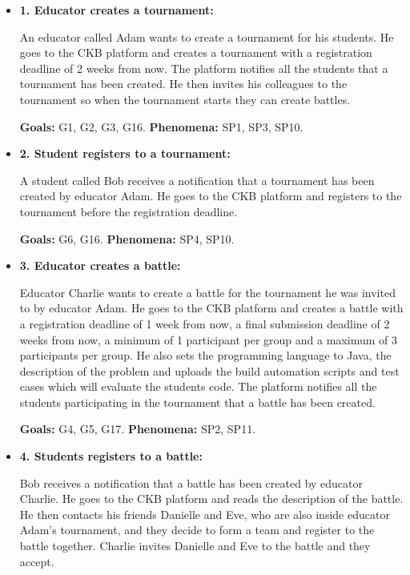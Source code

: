 \documentclass{article}
\begin{document}
\begin{itemize}
    \item \textbf{1. Educator creates a tournament:} 
    
    An educator called Adam wants to create a tournament for his students. He goes to the CKB platform and creates a tournament with a registration deadline of 2 weeks from now. The platform notifies all the students that a tournament has been created. He then invites his colleagues to the tournament so when the tournament starts they can create battles.

    \textbf{Goals:} G1, G2, G3, G16.
    \textbf{Phenomena:} SP1, SP3, SP10.

    \item \textbf{2. Student registers to a tournament:}
    
    A student called Bob receives a notification that a tournament has been created by educator Adam. He goes to the CKB platform and registers to the tournament before the registration deadline.

    \textbf{Goals:} G6, G16.
    \textbf{Phenomena:} SP4, SP10.

    \item \textbf{3. Educator creates a battle:}
    
    Educator Charlie wants to create a battle for the tournament he was invited to by educator Adam. He goes to the CKB platform and creates a battle with a registration deadline of 1 week from now, a final submission deadline of 2 weeks from now, a minimum of 1 participant per group and a maximum of 3 participants per group. He also sets the programming language to Java, the description of the problem and uploads the build automation scripts and test cases which will evaluate the students code. The platform notifies all the students participating in the tournament that a battle has been created.

    \textbf{Goals:} G4, G5, G17.
    \textbf{Phenomena:} SP2, SP11.

    \item \textbf{4. Students registers to a battle:}
    
    Bob receives a notification that a battle has been created by educator Charlie. He goes to the CKB platform and reads the description of the battle. He then contacts his friends Danielle and Eve, who are also inside educator Adam's tournament, and they decide to form a team and register to the battle together. Charlie invites Danielle and Eve to the battle and they accept. 


\end{itemize}
\end{document}
